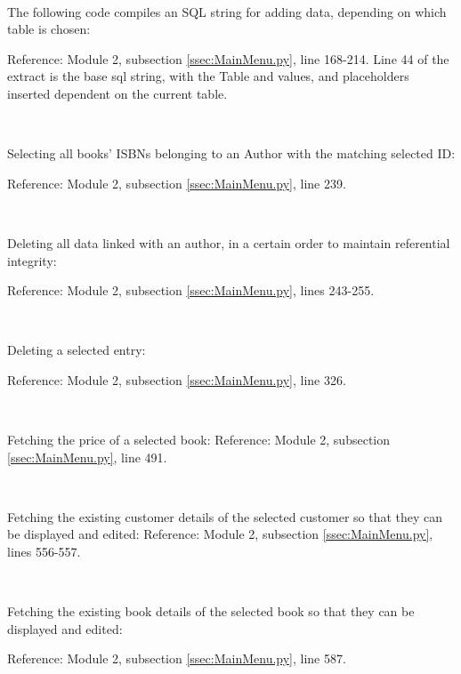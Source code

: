 \

The following code compiles an SQL string for adding data, depending on which table is chosen:
\begin{tiny}
\end{tiny}
Reference: Module 2,  subsection \ref{ssec:MainMenu.py}, line 168-214.
Line 44 of the extract is the base sql string, with the Table and values, and placeholders inserted dependent on the current table.

\

Selecting all books' ISBNs belonging to an Author with the matching selected ID:
\begin{tiny}
\end{tiny}
Reference: Module 2,  subsection \ref{ssec:MainMenu.py}, line 239.

\

Deleting all data linked with an author, in a certain order to maintain referential integrity:
\begin{tiny}
\end{tiny}
Reference: Module 2,  subsection \ref{ssec:MainMenu.py}, lines 243-255.

\

Deleting a selected entry:
\begin{tiny}
\end{tiny}
Reference: Module 2,  subsection \ref{ssec:MainMenu.py}, line 326.

\

Fetching the price of a selected book:
Reference: Module 2,  subsection \ref{ssec:MainMenu.py}, line 491.

\

Fetching the existing customer details of the selected customer so that they can be displayed and edited:
Reference: Module 2,  subsection \ref{ssec:MainMenu.py}, lines 556-557.

\

Fetching the existing book details of the selected book so that they can be displayed and edited:
\begin{tiny}
\end{tiny}
Reference: Module 2,  subsection \ref{ssec:MainMenu.py}, line 587.

